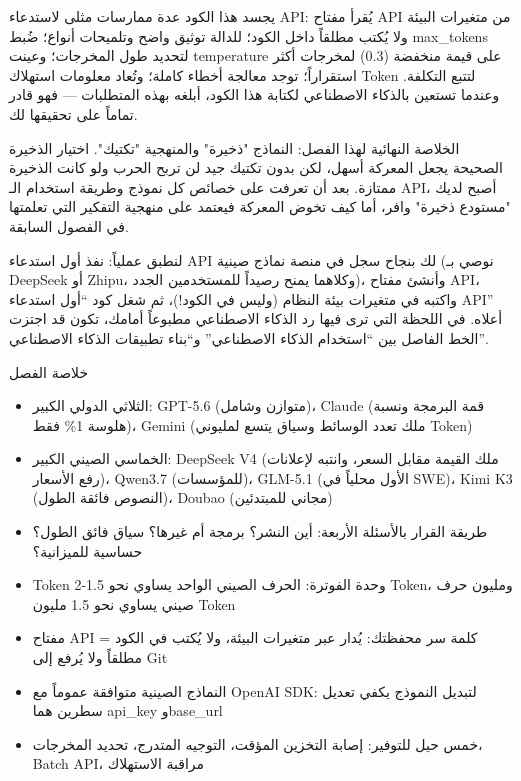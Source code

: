 يجسد هذا الكود عدة ممارسات مثلى لاستدعاء API: يُقرأ مفتاح API من متغيرات البيئة ولا يُكتب مطلقاً داخل الكود؛ للدالة توثيق واضح وتلميحات أنواع؛ ضُبط max\_tokens لتحديد طول المخرجات؛ وعينت temperature على قيمة منخفضة (0.3) لمخرجات أكثر استقراراً؛ توجد معالجة أخطاء كاملة؛ وتُعاد معلومات استهلاك Token لتتبع التكلفة. وعندما تستعين بالذكاء الاصطناعي لكتابة هذا الكود، أبلغه بهذه المتطلبات — فهو قادر تماماً على تحقيقها لك.

الخلاصة النهائية لهذا الفصل: النماذج "ذخيرة" والمنهجية "تكتيك". اختيار الذخيرة الصحيحة يجعل المعركة أسهل، لكن بدون تكتيك جيد لن تربح الحرب ولو كانت الذخيرة ممتازة. بعد أن تعرفت على خصائص كل نموذج وطريقة استخدام الـ API، أصبح لديك "مستودع ذخيرة" وافر، أما كيف تخوض المعركة فيعتمد على منهجية التفكير التي تعلمتها في الفصول السابقة.

\begin{tcbpractice}{لنطبق عملياً: نفذ أول استدعاء API لك بنجاح}
سجل في منصة نماذج صينية (نوصي بـ DeepSeek أو Zhipu، وكلاهما يمنح رصيداً للمستخدمين الجدد)، وأنشئ مفتاح API، واكتبه في متغيرات بيئة النظام (وليس في الكود!)، ثم شغل كود “أول استدعاء API” أعلاه. في اللحظة التي ترى فيها رد الذكاء الاصطناعي مطبوعاً أمامك، تكون قد اجتزت الخط الفاصل بين “استخدام الذكاء الاصطناعي” و“بناء تطبيقات الذكاء الاصطناعي”.

\end{tcbpractice}

\begin{tcbsummary}{خلاصة الفصل}
\begin{itemize}
  \item الثلاثي الدولي الكبير: GPT-5.6 (متوازن وشامل)، Claude (قمة البرمجة ونسبة هلوسة 1\% فقط)، Gemini (ملك تعدد الوسائط وسياق يتسع لمليوني Token)
  \item الخماسي الصيني الكبير: DeepSeek V4 (ملك القيمة مقابل السعر، وانتبه لإعلانات رفع الأسعار)، Qwen3.7 (للمؤسسات)، GLM-5.1 (الأول محلياً في SWE)، Kimi K3 (النصوص فائقة الطول)، Doubao (مجاني للمبتدئين)
  \item طريقة القرار بالأسئلة الأربعة: أين النشر؟ برمجة أم غيرها؟ سياق فائق الطول؟ حساسية للميزانية؟
  \item Token وحدة الفوترة: الحرف الصيني الواحد يساوي نحو 1.5-2 Token، ومليون حرف صيني يساوي نحو 1.5 مليون Token
  \item مفتاح API = كلمة سر محفظتك: يُدار عبر متغيرات البيئة، ولا يُكتب في الكود مطلقاً ولا يُرفع إلى Git
  \item النماذج الصينية متوافقة عموماً مع OpenAI SDK: لتبديل النموذج يكفي تعديل سطرين هما api\_key وbase\_url
  \item خمس حيل للتوفير: إصابة التخزين المؤقت، التوجيه المتدرج، تحديد المخرجات، Batch API، مراقبة الاستهلاك
\end{itemize}

\end{tcbsummary}
